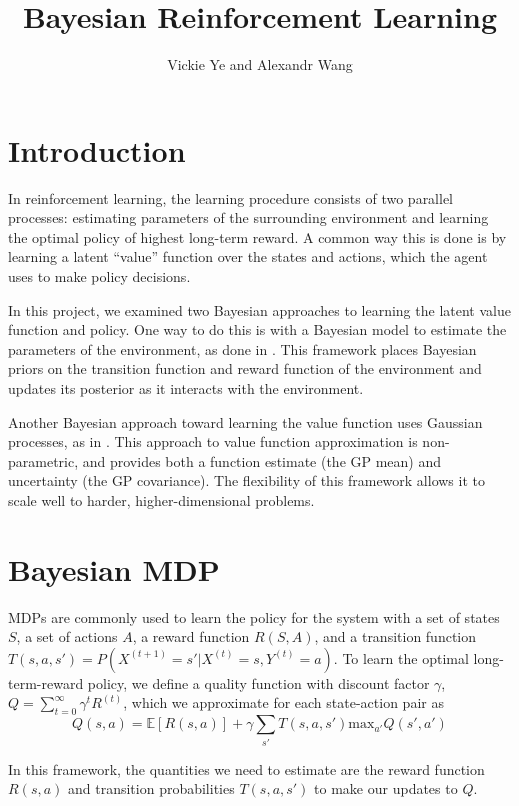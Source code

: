 \documentclass[10pt, twocolumn, twoside]{article}
\title{Bayesian Reinforcement Learning}
\date{}
\author {Vickie Ye and Alexandr Wang}
\begin{document}
\maketitle

\section{Introduction}
In reinforcement learning, the learning procedure consists of two parallel processes:
estimating parameters of the surrounding environment and learning the optimal policy
of highest long-term reward. A common way this is done is by learning a latent ``value''
function over the states and actions, which the agent uses to make policy decisions.

In this project, we examined two Bayesian approaches to learning the latent value function
and policy. One way to do this is with a Bayesian model to estimate the parameters of the
environment, as done in \cite{strens}. This framework places Bayesian priors on the
transition function and reward function of the environment and updates its posterior
as it interacts with the environment. 

Another Bayesian approach toward learning the value function uses Gaussian processes, as
in \cite{engel}. This approach to value function approximation is non-parametric, and
provides both a function estimate (the GP mean) and uncertainty (the GP covariance).
The flexibility of this framework allows it to scale well to harder, higher-dimensional
problems.

\section{Bayesian MDP}
MDPs are commonly used to learn the policy for the system with a set of states $S$,
a set of actions $A$, a reward function $R(S, A)$, and a transition function
$T(s, a, s') = P(X^{(t+1)} = s' | X^{(t)} = s, Y^{(t)} = a)$. To learn the optimal
long-term-reward policy, we define a quality function with discount factor
$\gamma$, $Q = \sum_{t=0}^\infty \gamma^t R^{(t)}$, which we approximate for each
state-action pair as
\begin{equation*}
Q(s, a) = \mathbb{E}[R(s,a)]+\gamma\sum_{s'}T(s, a, s')\textrm{max}_{a'} Q(s',a')
\end{equation*}

In this framework, the quantities we need to estimate are the reward function
$R(s, a)$ and transition probabilities $T(s, a, s')$ to make our updates to $Q$.
\end{document}
